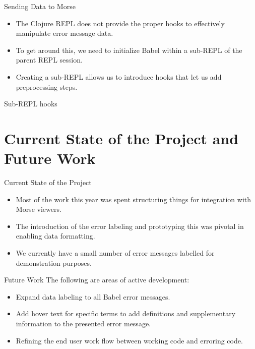 \documentclass{beamer}
\begin{document}
\begin{frame}{Sending Data to Morse}
  \begin{itemize}
    \item<1-> The Clojure REPL does not provide the proper hooks to effectively manipulate error message data.
    \item<2-> To get around this, we need to initialize Babel within a sub-REPL of the parent REPL session.
    \item<3-> Creating a sub-REPL allows us to introduce hooks that let us add preprocessing steps.
  \end{itemize}
\end{frame}

\begin{frame}{Sub-REPL hooks}

\end{frame}

\section{Current State of the Project and Future Work}
\begin{frame}{Current State of the Project}
  \begin{itemize}
    \item<1-> Most of the work this year was spent structuring things for integration with Morse viewers.
    \item<2-> The introduction of the error labeling and prototyping this was pivotal in enabling data formatting.
    \item<3-> We currently have a small number of error messages labelled for demonstration purposes.
  \end{itemize}
\end{frame}

\begin{frame}{Future Work}
  The following are areas of active development:
  \begin{itemize}
    \item<1-> Expand data labeling to all Babel error messages.
    \item<2-> Add hover text for specific terms to add definitions and supplementary information to the presented error message.
    \item<3-> Refining the end user work flow between working code and erroring code.
  \end{itemize}
  \end{frame}
\end{document}
